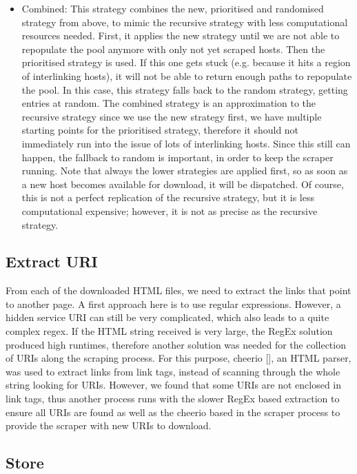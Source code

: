 \documentclass[USenglish,oneside,twocolumn]{article}
\begin{document}
\begin{itemize}
  \item Combined: This strategy combines the new, prioritised and randomised strategy from above, to mimic the recursive strategy with less computational resources needed. First, it applies the new strategy until we are not able to repopulate the pool anymore with only not yet scraped hosts. Then the prioritised strategy is used. If this one gets stuck (e.g. because it hits a region of interlinking hosts), it will not be able to return enough paths to repopulate the pool. In this case, this strategy falls back to the random strategy, getting entries at random. 
  The combined strategy is an approximation to the recursive strategy since we use the new strategy first, we have multiple starting points for the prioritised strategy, therefore it should not immediately run into the issue of lots of interlinking hosts. Since this still can happen, the fallback to random is important, in order to keep the scraper running. Note that always the lower strategies are applied first, so as soon as a new host becomes available for download, it will be dispatched. Of course, this is not a perfect replication of the recursive strategy, but it is less computational expensive; however, it is not as precise as the recursive strategy.
\end{itemize}
\subsection{Extract URI }
From each of the downloaded HTML files, we need to extract the links that point to another page. A first approach here is to use regular expressions. However, a hidden service URI can still be very complicated, which also leads to a quite complex regex. If the HTML string received is very large, the RegEx solution produced high runtimes, therefore another solution was needed for the collection of URIs along the scraping process. For this purpose, cheerio [], an HTML parser, was used to extract links from link tags, instead of scanning through the whole string looking for URIs. However, we found that some URIs are not enclosed in link tags, thus another process runs with the slower RegEx based extraction to ensure all URIs are found as well as the cheerio based in the scraper process to provide the scraper with new URIs to download.
\subsection{Store }
\end{document}
